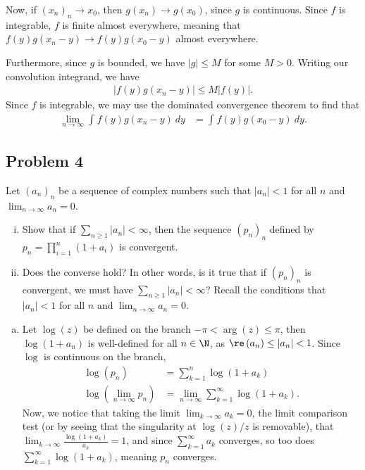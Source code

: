 \documentclass[10pt]{mypackage}
\begin{document}
Now, if $\left( x_n \right)_n\rightarrow x_0$, then $g\left( x_n \right)\rightarrow g\left( x_0 \right)$, since $g$ is continuous. Since $f$ is integrable, $f$ is finite almost everywhere, meaning that $f(y)g\left( x_n-y \right) \rightarrow f(y)g\left( x_0-y \right)$ almost everywhere.\newline

Furthermore, since $g$ is bounded, we have $\left\vert g \right\vert \leq M$ for some $M > 0$. Writing our convolution integrand, we have
\begin{align*}
  \left\vert f(y)g\left( x_n-y \right) \right\vert \leq M\left\vert f(y) \right\vert.
\end{align*}
Since $f$ is integrable, we may use the dominated convergence theorem to find that
\begin{align*}
  \lim_{n\rightarrow\infty} \int_{}^{} f(y)g\left( x_n-y \right)\:dy &= \int_{}^{} f(y)g\left( x_0-y \right)\:dy.
\end{align*}
\subsection{Problem 4}%
\begin{problem}
  Let $\left( a_n \right)_n$ be a sequence of complex numbers such that $\left\vert a_n \right\vert < 1$ for all $n$ and $\lim_{n\rightarrow\infty} a_n = 0$.
  \begin{enumerate}[(i)]
    \item Show that if $\sum_{n\geq 1}\left\vert a_n \right\vert < \infty$, then the sequence $\left( p_n \right)_n$ defined by $p_n = \prod_{i=1}^{n}\left( 1 + a_i \right)$ is convergent.
    \item Does the converse hold? In other words, is it true that if $\left( p_n \right)_n$ is convergent, we must have $\sum_{n\geq 1}\left\vert a_n \right\vert < \infty$? Recall the conditions that $\left\vert a_n \right\vert < 1$ for all $n$ and $\lim_{n\rightarrow \infty}a_n = 0$.
  \end{enumerate}
\end{problem}
\begin{enumerate}[(a)]
  \item Let $\log(z)$ be defined on the branch $-\pi < \arg(z) \leq \pi$, then $\log\left( 1+a_n \right)$ is well-defined for all $n\in\N$, as $\re\left( a_n \right) \leq \left\vert a_n \right\vert < 1$. Since $\log$ is continuous on the branch,
    \begin{align*}
      \log\left( p_n \right) &= \sum_{k=1}^{n} \log\left( 1+a_k \right)\\
      \log\left( \lim_{n\rightarrow\infty} p_n \right) &= \lim_{n\rightarrow\infty} \sum_{k=1}^{\infty} \log\left( 1+a_k \right).
    \end{align*}
    Now, we notice that taking the limit $\lim_{k\rightarrow\infty}a_k = 0$, the limit comparison test (or by seeing that the singularity at $\log(z)/z$ is removable), that $\lim_{k\rightarrow\infty} \frac{\log\left(1+a_k\right)}{a_k} = 1$, and since $\sum_{k=1}^{\infty}a_k$ converges, so too does $\sum_{k=1}^{\infty}\log\left( 1+a_k \right)$, meaning $p_n$ converges.
\end{enumerate}
\end{document}
